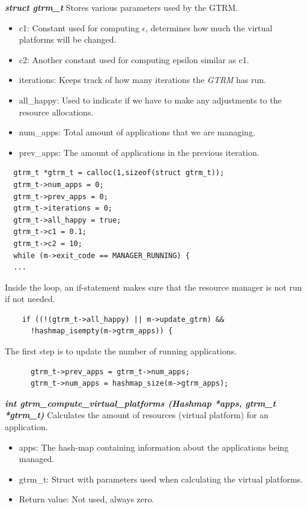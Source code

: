\documentclass[nobiblatex]{LTHthesis}
\begin{document}
\begin{framed}
	\begin{flushleft}
			\textbf{\emph{{struct gtrm\_t}}} \newline
			Stores various parameters used by the GTRM.
			\begin{itemize}
			\item c1: Constant used for computing $\epsilon$, determines how much 
		the virtual platforms will be changed.
			\item c2: Another constant used for computing epsilon similar as c1.
			\item iterations: Keeps track of how many iterations the \emph{GTRM} has run.
			\item all\_happy: Used to indicate if we have to make any adjustments 
		to the resource allocations.
			\item num\_apps: Total amount of applications that we are managing.
			\item prev\_apps: The amount of applications in the previous iteration.
			\end{itemize}
	\end{flushleft}	
\end{framed}

\begin{lstlisting}
  gtrm_t *gtrm_t = calloc(1,sizeof(struct gtrm_t));
  gtrm_t->num_apps = 0;
  gtrm_t->prev_apps = 0;
  gtrm_t->iterations = 0;
  gtrm_t->all_happy = true;
  gtrm_t->c1 = 0.1;
  gtrm_t->c2 = 10;
  while (m->exit_code == MANAGER_RUNNING) {
  ...
\end{lstlisting}
Inside the loop, an if-statement makes sure that the resource manager is not run if not needed. 
\begin{lstlisting}
	if ((!(gtrm_t->all_happy) || m->update_gtrm) && 
	  !hashmap_isempty(m->gtrm_apps)) {
\end{lstlisting}

The first step is to update the number of running applications.
\begin{lstlisting}
	  gtrm_t->prev_apps = gtrm_t->num_apps;
	  gtrm_t->num_apps = hashmap_size(m->gtrm_apps);
\end{lstlisting}

\begin{framed}
	\begin{flushleft}
			\textbf{\emph{{int gtrm\_compute\_virtual\_platforms \newline
	  (Hashmap *apps, gtrm\_t *gtrm\_t)}}} \newline
			Calculates the amount of resources (virtual platform) for an application.
			\begin{itemize}
			\item apps: The hash-map containing information about the
		applications being managed.
			\item gtrm\_t: Struct with parameters used when calculating the 
		virtual platforms.
			\item Return value: Not used, always zero.
			\end{itemize}
		\end{flushleft}	
\end{framed}
\end{document}
